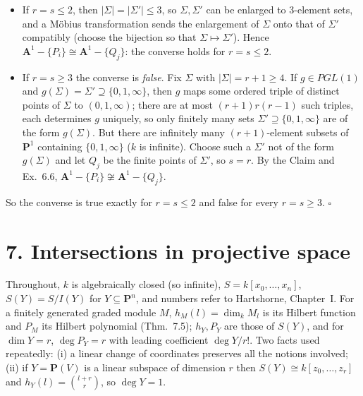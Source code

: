 \documentclass[11pt]{article}
\begin{document}
\begin{itemize}
\item If $r=s\le2$, then $|\Sigma|=|\Sigma'|\le3$, so $\Sigma,\Sigma'$ can be enlarged to $3$-element sets, and a Möbius transformation sends the enlargement of $\Sigma$ onto that of $\Sigma'$ compatibly (choose the bijection so that $\Sigma\mapsto\Sigma'$). Hence $\mathbf A^1-\{P_i\}\cong\mathbf A^1-\{Q_j\}$: the converse holds for $r=s\le 2$.
\item If $r=s\ge3$ the converse is \emph{false}. Fix $\Sigma$ with $|\Sigma|=r+1\ge4$. If $g\in PGL(1)$ and $g(\Sigma)=\Sigma'\supseteq\{0,1,\infty\}$, then $g$ maps some ordered triple of distinct points of $\Sigma$ to $(0,1,\infty)$; there are at most $(r+1)r(r-1)$ such triples, each determines $g$ uniquely, so only finitely many sets $\Sigma'\supseteq\{0,1,\infty\}$ are of the form $g(\Sigma)$. But there are infinitely many $(r+1)$-element subsets of $\mathbf P^1$ containing $\{0,1,\infty\}$ ($k$ is infinite). Choose such a $\Sigma'$ not of the form $g(\Sigma)$ and let $Q_j$ be the finite points of $\Sigma'$, so $s=r$. By the Claim and Ex.~6.6, $\mathbf A^1-\{P_i\}\not\cong\mathbf A^1-\{Q_j\}$.
\end{itemize}
So the converse is true exactly for $r=s\le2$ and false for every $r=s\ge3$. \hfill$\square$

\section*{7. Intersections in projective space}

Throughout, $k$ is algebraically closed (so infinite), $S=k[x_0,\dots,x_n]$, $S(Y)=S/I(Y)$ for $Y\subseteq\mathbf P^n$, and numbers refer to Hartshorne, Chapter~I. For a finitely generated graded module $M$, $h_M(l)=\dim_kM_l$ is its Hilbert function and $P_M$ its Hilbert polynomial (Thm.~7.5); $h_Y,P_Y$ are those of $S(Y)$, and for $\dim Y=r$, $\deg P_Y=r$ with leading coefficient $\deg Y/r!$. Two facts used repeatedly: (i) a linear change of coordinates preserves all the notions involved; (ii) if $Y=\mathbf P(V)$ is a linear subspace of dimension $r$ then $S(Y)\cong k[z_0,\dots,z_r]$ and $h_Y(l)=\binom{l+r}{r}$, so $\deg Y=1$.
\end{document}
